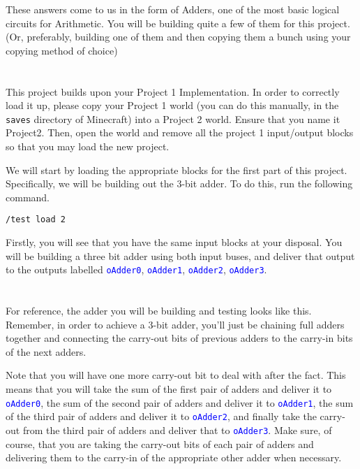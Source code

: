 \documentclass{article}
\newcommand{\varout}[1]{\textcolor{blue}{\texttt{#1}}}
\begin{document}
These answers come to us in the form of Adders, one of the most basic logical circuits for Arithmetic. You will be building quite a few of them for this project. (Or, preferably, building one of them and then copying them a bunch using your copying method of choice)

\section{\selectfont{Part A: Building the Adders}}

This project builds upon your Project 1 Implementation. In order to correctly load it up, please copy your Project 1 world (you can do this manually, in the \texttt{saves} directory of Minecraft) into a Project 2 world. Ensure that you name it Project2. Then, open the world and remove all the project 1 input/output blocks so that you may load the new project.

We will start by loading the appropriate blocks for the first part of this project. Specifically, we will be building out the 3-bit adder. To do this, run the following command. 

\begin{tcolorbox}
  \texttt{/test load 2}
\end{tcolorbox}

Firstly, you will see that you have the same input blocks at your disposal.
You will be building a three bit adder using both input buses, and deliver that output to the outputs labelled \varout{oAdder0}, \varout{oAdder1}, \varout{oAdder2}, \varout{oAdder3}.

\section{\selectfont{Part A: Schematics}}

For reference, the adder you will be building and testing looks like this. Remember, in order to achieve a 3-bit adder, you'll just be chaining full adders together and connecting the carry-out bits of previous adders to the carry-in bits of the next adders.

Note that you will have one more carry-out bit to deal with after the fact. This means that you will take the sum of the first pair of adders and deliver it to \varout{oAdder0}, the sum of the second pair of adders and deliver it to \varout{oAdder1}, the sum of the third pair of adders and deliver it to \varout{oAdder2}, and finally take the carry-out from the third pair of adders and deliver that to \varout{oAdder3}.
Make sure, of course, that you are taking the carry-out bits of each pair of adders and delivering them to the carry-in of the appropriate other adder when necessary.
\end{document}
